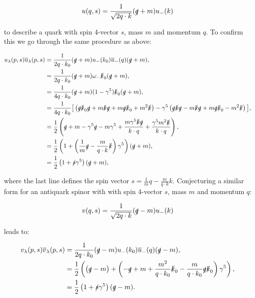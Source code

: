 		\begin{equation}
			\label{u_def}
			u(q, s) = \frac{1}{\sqrt{2q\cdot k}}(\slashed q + m)u_-(k)
		\end{equation}

		to describe a quark with spin 4-vector $s$, mass $m$ and momentum $q$.  To confirm this we go through the same procedure as above:

		\begin{subequations}
		\begin{align*}
			u_\lambda(p,s)\overline{u}_\lambda(p,s) &= \frac{1}{2q\cdot k_0}(\slashed q + m) u_-(k_0)\overline{u}_-(q)(\slashed q + m),\\
			&= \frac{1}{2q\cdot k_0}(\slashed q + m) \omega_-\slashed k_0 (\slashed q + m), \\
			&= \frac{1}{4q\cdot k_0}(\slashed q + m) (1-\gamma^{5})\slashed k_0 (\slashed q + m), \\
			&= \frac{1}{4q\cdot k_0}\big[\left(\slashed q \slashed k_0 \slashed q + m\slashed k\slashed q + m\slashed q \slashed
			k_0 + m^2 \slashed k\right)-\gamma^{5}\left(\slashed q\slashed k\slashed q - m\slashed k\slashed q + m\slashed q\slashed k_0 - m^2\slashed k\right)\big], \\
			&= \frac{1}{2}\left(\slashed q + m - \gamma^{5}\slashed q - m\gamma^{5} + \frac{m\gamma^{5}\slashed k\slashed q}{k\cdot q} + \frac{\gamma^{5}m^2\slashed k}{k\cdot q}\right),\\
			&= \frac{1}{2}\left(1+\left(\frac{1}{m}\slashed q - \frac{m}{q\cdot k}\slashed k\right)\gamma^{5}\right)(\slashed q + m),\\
			&= \frac{1}{2}\left(1+\slashed s\gamma^{5}\right)(\slashed q + m),\\
		\end{align*}
		\end{subequations}

		where the last line defines the spin vector $s = \frac{1}{m} q - \frac{m}{q\cdot k}k$.  Conjecturing
		a similar form for an antiquark spinor with with spin 4-vector $s$, mass $m$ and momentum $q$:

		\begin{equation}
			\label{v_def}
			v(q, s) = \frac{1}{\sqrt{2q\cdot k}}(\slashed q - m)u_-(k)
		\end{equation}

		leads to:

		\begin{subequations}
		\begin{align*}
			v_\lambda(p,s)\overline{v}_\lambda(p,s) &= \frac{1}{2q\cdot k_0}(\slashed q - m) u_-(k_0)\overline{u}_-(q)(\slashed q - m),\\
			&= \frac{1}{2}\left(\left(\slashed q - m\right) + \left(-\slashed q + m + \frac{m^2}{q\cdot k_0}\slashed k_0 -
			\frac{m}{q\cdot k_0}\slashed q\slashed k_0 \right)\gamma^{5}\right), \\
			&= \frac{1}{2}\left(1+\slashed s\gamma^{5}\right)(\slashed q - m).\\
		\end{align*}
		\end{subequations}

